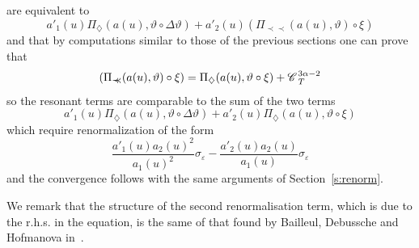 \documentclass[11pt,reqno]{amsart}
\newcommand{\precprec}{\prec\!\!\!\prec}
\newcommand{\CC}{\mathscr{C} \hspace{.1em}}
\begin{document}
are equivalent to
\[ a'_1 (u) \Pi_{\diamondsuit} (a (u), \vartheta \circ \Delta \vartheta) +
   a'_2 (u) (\Pi_{\precprec} (a (u), \vartheta) \circ \xi) \]
and that by computations similar to those of the previous sections one can
prove that
\[ (\Pi_{\precprec} (a (u), \vartheta) \circ \xi) = \Pi_{\diamondsuit} (a (u),
   \vartheta \circ \xi) + \CC^{3 \alpha - 2}_T \]
so the resonant terms are comparable to the sum of the two terms
\[ a'_1 (u) \Pi_{\diamondsuit} (a (u), \vartheta \circ \Delta \vartheta) +
   a'_2 (u) \Pi_{\diamondsuit} (a (u), \vartheta \circ \xi) \]
which require renormalization of the form
\begin{equation}
  \frac{a'_1 (u) a_2 (u)^2}{a_1 (u)^2} \sigma_{\varepsilon} - \frac{a'_2 (u)
  a_2 (u)}{a_1 (u)} \sigma_{\varepsilon} \label{eq:renorm-non-linear-rhs}
\end{equation}
and the convergence follows with the same arguments of Section~\ref{s:renorm}.

We remark that the structure of the second renormalisation term, which is due
to the r.h.s. in the equation, is the same of that found by Bailleul,
Debussche and Hofmanova in~{\cite{hofmanova}}.
\end{document}
